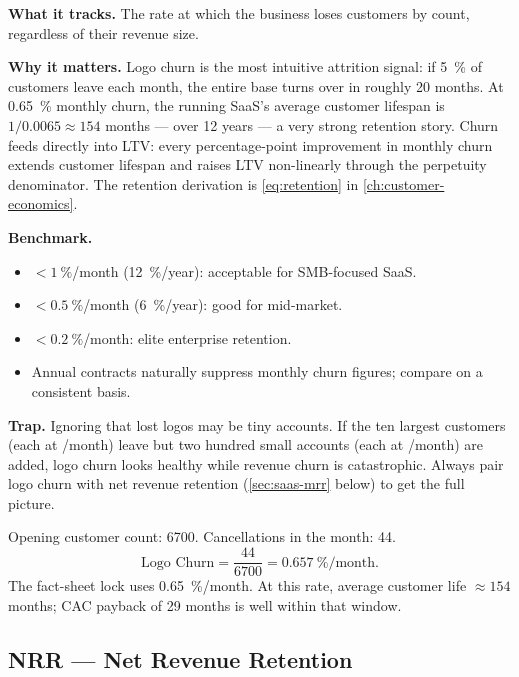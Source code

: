 \textbf{What it tracks.} The rate at which the business loses customers by count, regardless
of their revenue size.

\textbf{Why it matters.} Logo churn is the most intuitive attrition signal: if
\qty{5}{\percent} of customers leave each month, the entire base turns over in roughly
20 months. At \qty{0.65}{\percent} monthly churn, the running SaaS's average customer
lifespan is $1/0.0065 \approx 154$ months --- over 12 years --- a very strong retention
story. Churn feeds directly into LTV: every percentage-point improvement in monthly churn
extends customer lifespan and raises LTV non-linearly through the perpetuity denominator.
The retention derivation is \cref{eq:retention} in \cref{ch:customer-economics}.

\textbf{Benchmark.}
\begin{itemize}
  \item $<\qty{1}{\percent}$/month (\qty{12}{\percent}/year): acceptable for SMB-focused
    SaaS.
  \item $<\qty{0.5}{\percent}$/month (\qty{6}{\percent}/year): good for mid-market.
  \item $<\qty{0.2}{\percent}$/month: elite enterprise retention.
  \item Annual contracts naturally suppress monthly churn figures; compare on a consistent
    basis.
\end{itemize}

\textbf{Trap.} Ignoring that lost logos may be tiny accounts. If the ten largest customers
(each at /month) leave but two hundred small accounts (each at /month)
are added, logo churn looks healthy while revenue churn is catastrophic. Always pair logo
churn with net revenue retention (\cref{sec:saas-mrr} below) to get the full picture.

\begin{example}
Opening customer count: \num{6700}. Cancellations in the month: 44.
\[
  \text{Logo Churn} = \frac{44}{\num{6700}} = \qty{0.657}{\percent}/\text{month}.
\]
The fact-sheet lock uses \qty{0.65}{\percent}/month. At this rate, average customer life
$\approx 154$ months; CAC payback of 29 months is well within that window.
\end{example}


\subsection{NRR --- Net Revenue Retention}

